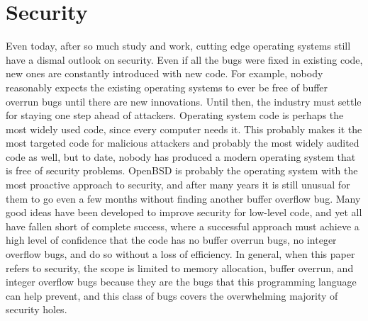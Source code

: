 \section{Security}

Even today, after so much study and work, cutting edge operating systems still have a dismal outlook on security.  Even
if all the bugs were fixed in existing code, new ones are constantly introduced with new code.  For example, nobody
reasonably expects the existing operating systems to ever be free of buffer overrun bugs until there are new
innovations.  Until then, the industry must settle for staying one step ahead of attackers.  Operating system code is perhaps
the most widely used code, since every computer needs it.  This probably makes it the most targeted code for malicious
attackers and probably the most widely audited code as well, but to date, nobody has produced a modern
operating system that is free of security problems.  OpenBSD is probably the operating system with the most proactive
approach to security, and after many years it is still unusual for them to go even a few months without finding another
buffer overflow bug\cite{openbsd-security}.  Many good ideas have been developed to improve security for low-level code,
and yet all have fallen short of complete success, where a successful approach must achieve a high level of confidence
that the code has no buffer overrun bugs, no integer overflow bugs, and do so without a loss of efficiency.  In general,
when this paper refers to security, the scope is limited to memory allocation, buffer overrun, and integer overflow bugs because
they are the bugs that this programming language can help prevent, and this class of bugs covers the overwhelming majority
of security holes.\cite{2002xu, 2000cowan, 2003cowan}


